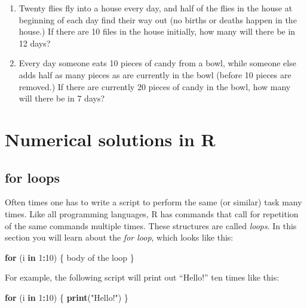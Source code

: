 \documentclass[
]{book}
\newenvironment{Shaded}{\begin{snugshade}}{\end{snugshade}}
\newcommand{\ControlFlowTok}[1]{\textcolor[rgb]{0.13,0.29,0.53}{\textbf{#1}}}
\newcommand{\DecValTok}[1]{\textcolor[rgb]{0.00,0.00,0.81}{#1}}
\newcommand{\KeywordTok}[1]{\textcolor[rgb]{0.13,0.29,0.53}{\textbf{#1}}}
\newcommand{\NormalTok}[1]{#1}
\newcommand{\OperatorTok}[1]{\textcolor[rgb]{0.81,0.36,0.00}{\textbf{#1}}}
\newcommand{\StringTok}[1]{\textcolor[rgb]{0.31,0.60,0.02}{#1}}
\theoremstyle{definition}
\theoremstyle{definition}
\theoremstyle{definition}
\theoremstyle{remark}
\begin{document}
\begin{enumerate}
\item
  Twenty flies fly into a house every day, and half of the flies in the house at beginning of each day find their way out (no births or deaths happen in the house.) If there are 10 files in the house initially, how many will there be in 12 days?
\item
  Every day someone eats 10 pieces of candy from a bowl, while someone else adds half as many pieces as are currently in the bowl (before 10 pieces are removed.) If there are currently 20 pieces of candy in the bowl, how many will there be in 7 days?
\end{enumerate}

\hypertarget{numerical-solutions-in-r}{%
\section{Numerical solutions in R}\label{numerical-solutions-in-r}}

\label{sec:comp14}

\hypertarget{for-loops}{%
\subsection{for loops}\label{for-loops}}

Often times one has to write a script to perform the same (or similar) task many times. Like all programming languages, R has commands that call for repetition of the same commands multiple times. These structures are called \emph{loops}. In this section you will learn about the  \emph{for loop}, which looks like this:

\begin{Shaded}
\begin{Highlighting}[]
\ControlFlowTok{for}\NormalTok{ (i }\ControlFlowTok{in} \DecValTok{1}\OperatorTok{:}\DecValTok{10}\NormalTok{) \{}
\NormalTok{    body of the loop}
\NormalTok{\}}
\end{Highlighting}
\end{Shaded}

For example, the following script will print out ``Hello!'' ten times like this:

\begin{Shaded}
\begin{Highlighting}[]
\ControlFlowTok{for}\NormalTok{ (i }\ControlFlowTok{in} \DecValTok{1}\OperatorTok{:}\DecValTok{10}\NormalTok{) \{}
    \KeywordTok{print}\NormalTok{(}\StringTok{"Hello!"}\NormalTok{)}
\NormalTok{\}}
\end{Highlighting}
\end{Shaded}
\end{document}
